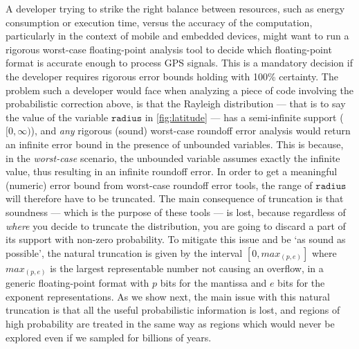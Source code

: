 A developer trying to strike the right balance between resources, such as energy consumption or execution time, versus the accuracy of the computation, particularly in the context of mobile and embedded devices, might want to run a rigorous worst-case floating-point analysis tool to decide which floating-point format is accurate enough to process GPS signals.
%
This is a mandatory decision if the developer requires rigorous error bounds holding with 100\% certainty.
%
The problem such a developer would face when analyzing a piece of code involving the probabilistic correction above, is that the Rayleigh distribution --- that is to say the value of the variable $\mathtt{radius}$ in \cref{fig:latitude} --- has a semi-infinite support (\ie $[0, \infty)$), and \emph{any} rigorous (\ie sound) worst-case roundoff error analysis would return an infinite error bound in the presence of unbounded variables.
%
This is because, in the \emph{worst-case} scenario, the unbounded variable assumes exactly the infinite value, thus resulting in an infinite roundoff error.
%
In order to get a meaningful (numeric) error bound from worst-case roundoff error tools, the range of $\mathtt{radius}$ will therefore have to be truncated. The main consequence of truncation is that soundness --- which is the purpose of these tools --- is lost, because regardless of \emph{where} you decide to truncate the distribution, you are going to discard a part of its support with non-zero probability. To mitigate this issue and be `as sound as possible', the natural truncation is given by the interval $[0,max_{(p, e)}]$ where $max_{(p, e)}$ is the largest representable number not causing an overflow, in a generic floating-point format with $p$ bits for the mantissa and $e$ bits for the exponent representations.
As we show next, the main issue with this natural truncation is that all the useful probabilistic information is lost, and regions of high probability are treated in the same way as regions which would never be explored even if we sampled for billions of years.

